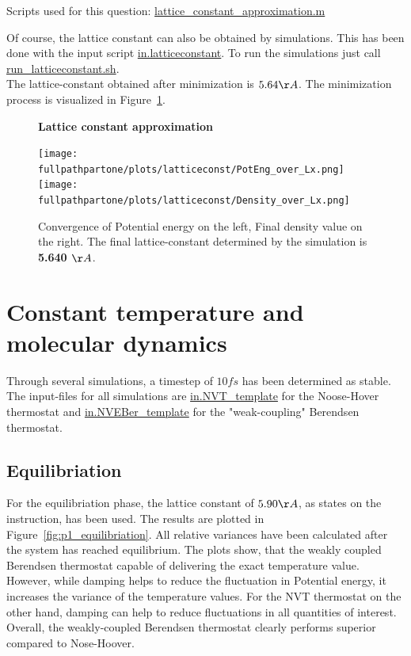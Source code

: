 \documentclass[10pt,a4paper]{report}
\def \pathpartone {../../1_three-dimensional_atomic_system}
\def \fullpathpartone {/home/lukas/Desktop/project/independence/atomistic_modeling/exam/1_three-dimensional_atomic_system}
\newcommand*{\figuretitle}[1]{%
    {\centering%
    \textbf{#1}%
    \par\medskip}%
}
\begin{document}
Scripts used for this question:
\href{../../lattice_constant_approximation.m}{lattice\_constant\_approximation.m}


Of course, the lattice constant can also be obtained by simulations. This has been done with the input script \href{../../DIR1/in.latticeconstant}{in.latticeconstant}. To run the simulations just call \href{../../DIR1/run_latticeconstant.sh}{run\_latticeconstant.sh}.\\
The lattice-constant obtained after minimization is $5.64 \AA$. The minimization process is visualized in Figure~\ref{fig:p1_latticeconst}.

\begin{center}
\begin{figure}[h]
\figuretitle{Lattice constant approximation}
\texttt{[image: \\fullpathpartone/plots/latticeconst/PotEng\_over\_Lx.png]}~
\texttt{[image: \\fullpathpartone/plots/latticeconst/Density\_over\_Lx.png]}~
\caption[Lattice constant determination - convergence]{Convergence of Potential energy on the left, Final density value on the right. The final lattice-constant determined by the simulation is \textbf{5.640 $\AA$}. }
\label{fig:p1_latticeconst}
\end{figure}
\end{center}


\section{Constant temperature and molecular dynamics}
Through several simulations, a timestep of $10 fs$ has been determined as stable. The input-files for all simulations are \href{\pathpartone/in.NVT_template}{in.NVT\_template} for the Noose-Hover thermostat and \href{\pathpartone/in.NVEBer_template}{in.NVEBer\_template} for the "weak-coupling" Berendsen thermostat.

\subsection{Equilibriation}
For the equilibriation phase, the lattice constant of $5.90 \AA$, as states on the instruction, has been used. The results are plotted in Figure~\ref{fig:p1_equilibriation}. All relative variances have been calculated after the system has reached equilibrium. The plots show, that the weakly coupled Berendsen thermostat capable of delivering the exact temperature value. However, while damping helps to reduce the fluctuation in Potential energy, it increases the variance of the temperature values. For the NVT thermostat on the other hand, damping can help to reduce fluctuations in all quantities of interest.\\
Overall, the weakly-coupled Berendsen thermostat clearly performs superior compared to Nose-Hoover.
\end{document}
